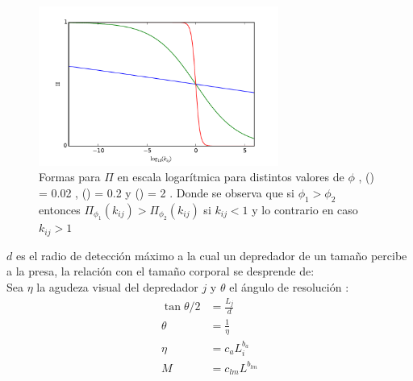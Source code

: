 \begin{figure}
\begin{center}
 \includegraphics[width=0.7\textwidth]{./Plots/CaptureEfficiency.pdf}
 \caption[$\Pi$]{ Formas para $\Pi$ en escala logar\'itmica para distintos valores de $\phi$ , ({\hwplotB}) = 0.02 , ({\hwplotG}) = 0.2 y ({\hwplotR}) = 2 . Donde se observa que si $\phi_1 > \phi_2$ entonces $\Pi_{\phi_1}(k_{ij}) >\Pi_{\phi_2}(k_{ij})$ si $k_{ij} < 1$ y lo contrario en caso $k_{ij}>1$ }
 \label{fig:efficiency} 
\end{center}
\end{figure}

$d$ es el radio de detecci\'on m\'aximo a la cual un depredador de un tama\~no percibe a la presa, la relaci\'on con el tama\~no corporal se desprende de:\\ Sea $\eta$ la agudeza visual del depredador $j$ y $\theta$ el \'angulo de resoluci\'on :
\begin{equation}\label{eq:d}
\begin{aligned}
\tan{\theta/2} &= \frac{L_{j}}{d} \\
\theta &= \frac{1}{\eta} \\
\eta & = c_a L_i^{b_a} \\
M &= c_{lm}L^{b_{lm}} 
\end{aligned}
\end{equation}
